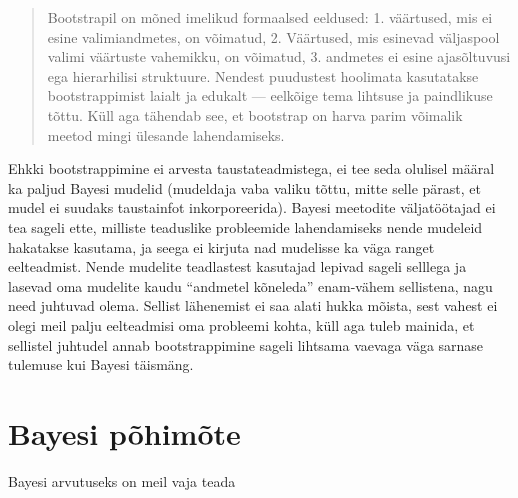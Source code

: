 \documentclass[]{book}
\begin{document}
\begin{quote}
Bootstrapil on mõned imelikud formaalsed eeldused: 1. väärtused, mis ei
esine valimiandmetes, on võimatud, 2. Väärtused, mis esinevad väljaspool
valimi väärtuste vahemikku, on võimatud, 3. andmetes ei esine
ajasõltuvusi ega hierarhilisi struktuure. Nendest puudustest hoolimata
kasutatakse bootstrappimist laialt ja edukalt --- eelkõige tema lihtsuse
ja paindlikuse tõttu. Küll aga tähendab see, et bootstrap on harva parim
võimalik meetod mingi ülesande lahendamiseks.
\end{quote}

Ehkki bootstrappimine ei arvesta taustateadmistega, ei tee seda olulisel
määral ka paljud Bayesi mudelid (mudeldaja vaba valiku tõttu, mitte
selle pärast, et mudel ei suudaks taustainfot inkorporeerida). Bayesi
meetodite väljatöötajad ei tea sageli ette, milliste teaduslike
probleemide lahendamiseks nende mudeleid hakatakse kasutama, ja seega ei
kirjuta nad mudelisse ka väga ranget eelteadmist. Nende mudelite
teadlastest kasutajad lepivad sageli selllega ja lasevad oma mudelite
kaudu ``andmetel kõneleda'' enam-vähem sellistena, nagu need juhtuvad
olema. Sellist lähenemist ei saa alati hukka mõista, sest vahest ei
olegi meil palju eelteadmisi oma probleemi kohta, küll aga tuleb
mainida, et sellistel juhtudel annab bootstrappimine sageli lihtsama
vaevaga väga sarnase tulemuse kui Bayesi täismäng.

\chapter{Bayesi põhimõte}\label{bayesi-pohimote}

Bayesi arvutuseks on meil vaja teada
\end{document}
